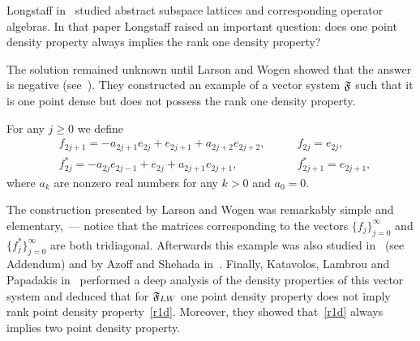 \documentclass[12pt]{amsart}
\theoremstyle{case}
\begin{document}

    Long\-staff in~\cite{longstaff} studied abstract subspace lattices and corresponding operator algebras.
    In that paper Longstaff raised an important question: does one point density property always implies the rank one density property?

    The solution remained unknown until Larson and Wogen showed that the answer is negative (see~\cite{larson}).
    They constructed an example of a vector system $\mathfrak{F}$ such that it is one point dense but does not possess the rank one density property.
    \begin{example}
      \label{lw-sys}
      For any $j \geq 0$ we define
      \begin{align*}
        &f_{2j+1}=-a_{2j+1}e_{2j} + e_{2j+1} + a_{2j+2}e_{2j+2}, \qquad &f_{2j}=e_{2j},\\
        &f^*_{2j}=-a_{2j}e_{2j-1} + e_{2j} + a_{2j+1}e_{2j+1}, \qquad &f^*_{2j+1}=e_{2j+1},
      \end{align*}
      where $a_k$ are nonzero real numbers for any $k > 0$ and $a_0 = 0$.
    \end{example}
    The construction presented by Larson and Wogen was remarkably simple and elementary,~--- notice that the matrices corresponding to
      the vectors $\{f_j\}_{j=0}^\infty$ and $\{f^*_j\}_{j=0}^\infty$ are both tridiagonal.
    Afterwards this example was also studied in~\cite{argyroslambrou} (see Addendum) and by Azoff and Shehada in~\cite{azoff}.
    Finally, Katavolos, Lambrou and Papadakis in~\cite{katavolos} performed a deep analysis of the density properties
      of this vector system and deduced that for $\mathfrak{F}_{LW}$ one point density property does not imply rank point density property~\eqref{r1d}.
    Moreover, they showed that~\eqref{r1d} always implies two point density property.
\end{document}
